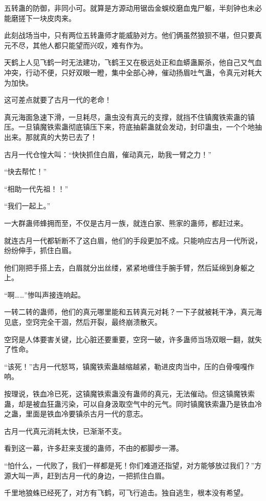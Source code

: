 \begin{this_body}
五转蛊的防御，非同小可。就算是方源动用锯齿金蜈绞磨血鬼尸躯，半刻钟也未必能磨搓下一块皮肉来。

此刻战场当中，只有两位五转蛊师才能威胁对方。他们俩虽然狼狈不堪，但只要真元不尽，其他人都只能望而兴叹，难有作为。

天鹤上人见飞鹤一时无法建功，飞鹤王又在极远处正和血蟒蛊厮杀，他自己又气血冲突，行动不便，只好双眼一瞪，集中全部心神，催动扬眉吐气蛊，令真元对耗大为加快。

这可差点就要了古月一代的老命！

真元海面急速下滑，一旦耗尽，蛊虫没有真元的支撑，就挡不住镇魔铁索蛊的镇压。一旦镇魔铁索蛊彻底镇压下来，符底抽薪蛊就会发动，封印蛊虫，一个个地抽出来。那就真的大势已去了！

古月一代仓惶大叫：“快快抓住白眉，催动真元，助我一臂之力！”

“快去帮忙！”

“相助一代先祖！！”

“我们一起上。”

一大群蛊师蜂拥而至，不仅是古月一族，就连白家、熊家的蛊师，都赶过来。

就连古月一代都斩断不了这白眉，他们的手段更加不成。只能响应古月一代所说，纷纷伸手，抓住白眉。

他们刚把手搭上去，白眉就分出丝缕，紧紧地缠住手腕手臂，然后延绵到身躯之上。

“啊……”惨叫声接连响起。

一转二转的蛊师，他们的真元哪里能和五转真元对耗？一下子就被耗干净，真元海见底，空窍完全干涸，然后开裂，最终崩溃散灭。

空窍是人体要害关键，比心脏还要重要，空窍一破，许多蛊师当场双眼一翻，就失了性命。

“该死！”古月一代怒骂，镇魔铁索蛊越缩越紧，勒进皮肉当中，压的白骨嘎嘎作响。

按理说，铁血冷已死，这镇魔铁索蛊没有蛊师的真元，无法催动。但这镇魔铁索蛊，却是被血狂蛊污染，可以自身汲取空气中的元气。同时镇魔铁索蛊乃是铁血冷之蛊，里面是铁血冷要镇杀古月一代的意志。

古月一代真元消耗太快，已渐渐不支。

看到这一幕，许多赶来支援的蛊师，不由的都脚步一滞。

“怕什么，一代败了，我们一样都是死！你们难道还指望，对方能够放过我们？”方源大叫一声，赶到古月一代的身边，一把抓住白眉。

千里地狼蛛已经死了，对方有飞鹤，可飞行追击。独自逃生，根本没有希望。


\end{this_body}
